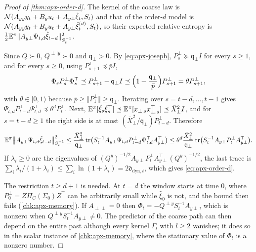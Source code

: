 \begin{proof}[Proof of \cref{thm:apx-order-d}]
The kernel of the coarse law is $\mathcal{N}(A_{yy}y_t+B_yu_t+A_{y\perp}\hat\xi_t,S_t)$ and that of the order-$d$ model is $\mathcal{N}(A_{yy}y_t+B_yu_t+A_{y\perp}\hat\xi^{(d)}_t,S_t)$, so their expected relative entropy is $\frac12\mathbb{E}^\pi\Vert A_{y\perp}\Psi_{t,d}\hat\xi_{t-d}\Vert^2_{S_t^{-1}}$.

Since $Q\succ0$, $Q^{\perp\mid y}\succ0$ and $\mathsf q_\perp>0$. By \cref{eq:apx-joseph}, $P^\perp_s\succeq\mathsf q_\perp I$ for every $s\ge1$, and for every $s\ge0$, using $P^\perp_{s+1}\preceq\bar pI$,
\begin{equation*}
\Phi_sP^\perp_s\Phi_s^\top\preceq P^\perp_{s+1}-\mathsf q_\perp I\preceq\Bigl(1-\frac{\mathsf q_\perp}{\bar p}\Bigr)P^\perp_{s+1}=\theta P^\perp_{s+1} ,
\end{equation*}
with $\theta\in[0,1)$ because $\bar p\ge\Vert P^\perp_1\Vert\ge\mathsf q_\perp$. Iterating over $s=t-d,\dots,t-1$ gives $\Psi_{t,d}P^\perp_{t-d}\Psi_{t,d}^\top\preceq\theta^dP^\perp_t$. Next, $\mathbb{E}^\pi[\hat\xi_s\hat\xi_s^\top]\preceq\mathbb{E}^\pi[x_{\perp,s}x_{\perp,s}^\top]\preceq\bar X_\perp^2I$, and for $s=t-d\ge1$ the right side is at most $(\bar X_\perp^2/\mathsf q_\perp)P^\perp_{t-d}$. Therefore
\begin{equation*}
\mathbb{E}^\pi\bigl\Vert A_{y\perp}\Psi_{t,d}\hat\xi_{t-d}\bigr\Vert^2_{S_t^{-1}}\le\frac{\bar X_\perp^2}{\mathsf q_\perp}\operatorname{tr}\bigl(S_t^{-1}A_{y\perp}\Psi_{t,d}P^\perp_{t-d}\Psi_{t,d}^\top A_{y\perp}^\top\bigr)\le\theta^d\frac{\bar X_\perp^2}{\mathsf q_\perp}\operatorname{tr}\bigl(S_t^{-1}A_{y\perp}P^\perp_tA_{y\perp}^\top\bigr).
\end{equation*}
If $\lambda_i\ge0$ are the eigenvalues of $(Q^y)^{-1/2}A_{y\perp}P^\perp_tA_{y\perp}^\top(Q^y)^{-1/2}$, the last trace is $\sum_i\lambda_i/(1+\lambda_i)\le\sum_i\ln(1+\lambda_i)=2\mathfrak d_{\mathrm{dyn},t}$, which gives \cref{eq:apx-order-d}.

The restriction $t\ge d+1$ is needed. At $t=d$ the window starts at time $0$, where $P^\perp_0=Z\Pi_C(\Sigma_0)Z^\top$ can be arbitrarily small while $\hat\xi_0$ is not, and the bound then fails (\cref{chk:apx-memory}). If $A_{\perp\perp}=0$ then $\Phi_t=-Q^{\perp y}S_t^{-1}A_{y\perp}$, which is nonzero when $Q^{\perp y}S_t^{-1}A_{y\perp}\ne0$. The predictor of the coarse path can then depend on the entire past although every kernel $\Gamma_l$ with $l\ge2$ vanishes; it does so in the scalar instance of \cref{chk:apx-memory}, where the stationary value of $\Phi_t$ is a nonzero number.
\end{proof}

